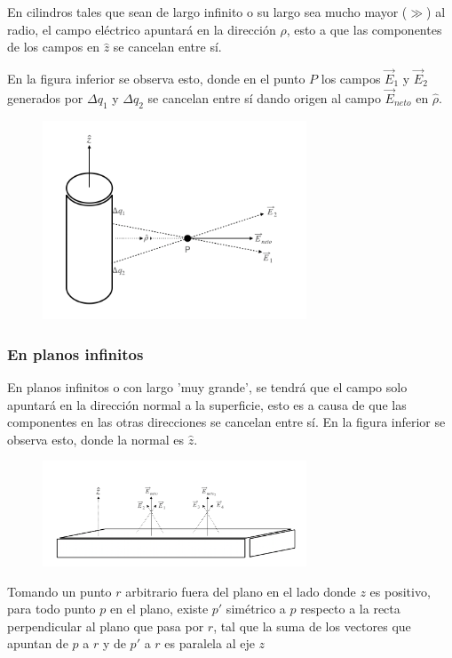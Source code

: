 \label{SimetríaCilindrosInf}
En cilindros tales que sean de largo infinito o su largo sea mucho mayor ($\gg$) al radio, el campo eléctrico apuntará en la dirección $\hat{\rho}$, esto a que las componentes de los campos en $\hat{z}$ se cancelan entre sí.

En la figura inferior se observa esto, donde en el punto $P$ los campos $\Vec{E}_1$ y $\Vec{E}_2$ generados por $\Delta q_1$ y $\Delta q_2$ se cancelan entre sí dando origen al campo $\Vec{E}_{neto}$ en $\hat{\rho}$.
\begin{figure}[H]
    \centering
    \includegraphics[width=0.7\textwidth]{Resultados_utiles/demost_simetria_cili.png}
    \label{fig:simetria_cilindro}
\end{figure}
\subsubsection{En planos infinitos}
\label{SimetríaPlanosInf}
En planos infinitos o con largo 'muy grande', se tendrá que el campo solo apuntará en la dirección normal a la superficie, esto es a causa de que las componentes en las otras direcciones se cancelan entre sí. 
\medbreak
En la figura inferior se observa esto, donde la normal es $\hat{z}$.
\begin{figure}[H]
    \centering
    \includegraphics[width=0.7\textwidth]{Resultados_utiles/demost_simetria_plano.png}
    \label{fig:simetria_plano}
\end{figure}
\medbreak
Tomando un punto $r$ arbitrario fuera del plano en el lado donde $z$ es positivo, para todo punto $p$ en el plano, existe $p'$ simétrico a $p$ respecto a la recta perpendicular al plano que pasa por $r$, tal que la suma de los vectores que apuntan de $p$ a $r$ y de $p'$ a $r$ es paralela al eje $z$

